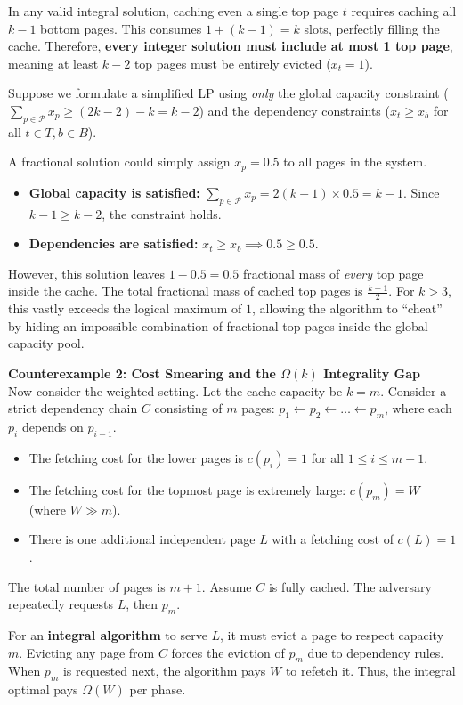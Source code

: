 \documentclass[a4paper]{article}
\begin{document}
In any valid integral solution, caching even a single top page $t$ requires caching all $k-1$ bottom pages. This consumes $1 + (k - 1) = k$ slots, perfectly filling the cache. Therefore, \textbf{every integer solution must include at most 1 top page}, meaning at least $k-2$ top pages must be entirely evicted ($x_t = 1$). 

Suppose we formulate a simplified LP using \textit{only} the global capacity constraint ($\sum_{p \in \mathcal{P}} x_p \ge (2k-2) - k = k-2$) and the dependency constraints ($x_t \ge x_b$ for all $t \in T, b \in B$). 

A fractional solution could simply assign $x_p = 0.5$ to all pages in the system. 
\begin{itemize}
    \item \textbf{Global capacity is satisfied:} $\sum_{p \in \mathcal{P}} x_p = 2(k-1) \times 0.5 = k-1$. Since $k-1 \ge k-2$, the constraint holds.
    \item \textbf{Dependencies are satisfied:} $x_t \ge x_b \implies 0.5 \ge 0.5$.
\end{itemize}
However, this solution leaves $1 - 0.5 = 0.5$ fractional mass of \textit{every} top page inside the cache. The total fractional mass of cached top pages is $\frac{k-1}{2}$. For $k > 3$, this vastly exceeds the logical maximum of $1$, allowing the algorithm to ``cheat'' by hiding an impossible combination of fractional top pages inside the global capacity pool.

\textbf{Counterexample 2: Cost Smearing and the $\Omega(k)$ Integrality Gap} \\
Now consider the weighted setting. Let the cache capacity be $k = m$. Consider a strict dependency chain $C$ consisting of $m$ pages: $p_1 \leftarrow p_2 \leftarrow \dots \leftarrow p_m$, where each $p_i$ depends on $p_{i-1}$. 
\begin{itemize}
    \item The fetching cost for the lower pages is $c(p_i) = 1$ for all $1 \le i \le m-1$.
    \item The fetching cost for the topmost page is extremely large: $c(p_m) = W$ (where $W \gg m$).
    \item There is one additional independent page $L$ with a fetching cost of $c(L) = 1$.
\end{itemize}
The total number of pages is $m+1$. Assume $C$ is fully cached. The adversary repeatedly requests $L$, then $p_m$.

For an \textbf{integral algorithm} to serve $L$, it must evict a page to respect capacity $m$. Evicting any page from $C$ forces the eviction of $p_m$ due to dependency rules. When $p_m$ is requested next, the algorithm pays $W$ to refetch it. Thus, the integral optimal pays $\Omega(W)$ per phase.
\end{document}
